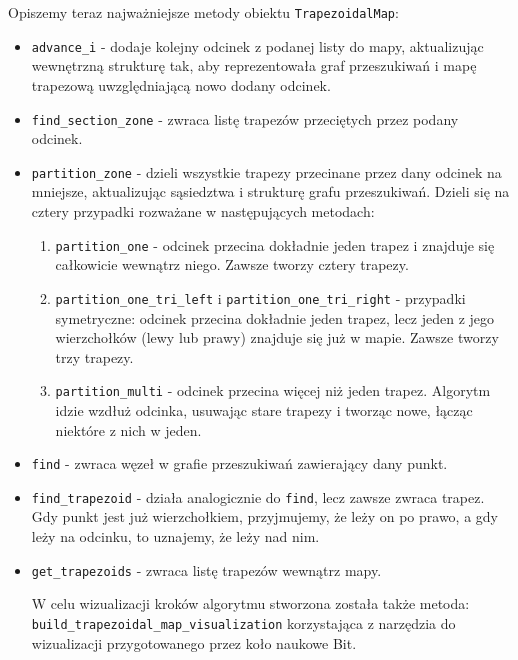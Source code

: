 \documentclass[11pt,a4paper]{article}
\begin{document}
Opiszemy teraz najważniejsze metody obiektu \verb|TrapezoidalMap|:
\begin{itemize}
    \item \verb|advance_i| - dodaje kolejny odcinek z podanej 
    listy do mapy, aktualizując wewnętrzną strukturę tak, aby
    reprezentowała graf przeszukiwań i mapę trapezową uwzględniającą
    nowo dodany odcinek.
    \item \verb|find_section_zone| - zwraca listę trapezów
    przeciętych przez podany odcinek.
    \item \verb|partition_zone| - dzieli wszystkie trapezy
    przecinane przez dany odcinek na mniejsze, aktualizując
    sąsiedztwa i strukturę grafu przeszukiwań. Dzieli się 
    na cztery przypadki rozważane w następujących metodach:
    \begin{enumerate}
        \item \verb|partition_one| - odcinek przecina dokładnie
        jeden trapez i znajduje się całkowicie wewnątrz niego.
        Zawsze tworzy cztery trapezy.
        \item \verb|partition_one_tri_left| i \verb|partition_one_tri_right| -
        przypadki symetryczne: odcinek przecina dokładnie jeden trapez,
        lecz jeden z jego wierzchołków (lewy lub prawy) znajduje się już
        w mapie. Zawsze tworzy trzy trapezy.
        \item \verb|partition_multi| - odcinek przecina więcej niż jeden
        trapez. Algorytm idzie wzdłuż odcinka, usuwając stare trapezy
        i tworząc nowe, łącząc niektóre z nich w jeden.
    \end{enumerate}
    \item \verb|find| - zwraca węzeł w grafie przeszukiwań
    zawierający dany punkt.
    \item \verb|find_trapezoid| - działa analogicznie do \verb|find|,
    lecz zawsze zwraca trapez. Gdy punkt jest już wierzchołkiem,
    przyjmujemy, że leży on po prawo, a gdy leży na odcinku, to uznajemy,
    że leży nad nim.
    \item \verb|get_trapezoids| - zwraca listę trapezów wewnątrz mapy.

W celu wizualizacji kroków algorytmu stworzona została także
metoda: \\ 
\verb|build_trapezoidal_map_visualization| korzystająca 
z narzędzia do wizualizacji przygotowanego przez koło naukowe Bit.
\end{itemize}
\end{document}

